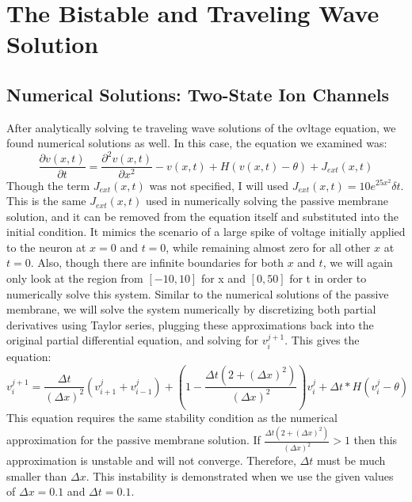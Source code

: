 \documentclass[12pt]{article}
\begin{document}
\section{The Bistable and Traveling Wave Solution}

\subsection{Numerical Solutions: Two-State Ion Channels}
After analytically solving te traveling wave solutions of the ovltage equation, we found numerical solutions as well. In this case, the equation we examined was:
\[\frac{\partial{v(x,t)}}{\partial{t}}=\frac{\partial^2{v(x,t)}}{\partial{x}^2}-v(x,t)+H(v(x,t)-\theta)+J_{ext}(x,t)\]
Though the term $J_{ext}(x,t)$ was not specified, I will used $J_{ext}(x,t)=10e^{25x^2}\delta{t}$. This is the same $J_{ext}(x,t)$ used in numerically solving the passive membrane solution, and it can be removed from the equation itself and substituted into the initial condition. It mimics the scenario of a large spike of voltage initially applied to the neuron at $x=0$ and $t=0$, while remaining almost zero for all other $x$ at $t=0$. Also, though there are infinite boundaries for both $x$ and $t$, we will again only look at the region from $[-10,10]$ for x and $[0,50]$ for t in order to numerically solve this system.  Similar to the numerical solutions of the passive membrane, we will solve the system numerically by discretizing both partial derivatives using Taylor series, plugging these approximations back into the original partial differential equation, and solving for $v^{j+1}_i$. This gives the equation:
\begin{equation} \label{**}
v^{j+1}_i=\frac{\Delta{t}}{(\Delta{x})^2}(v^{j}_{i+1}+v^{j}_{i-1})+(1-\frac{\Delta{t}(2+(\Delta{x})^2)}{(\Delta{x})^2})v^{j}_{i}+\Delta{t}*H(v^j_i-\theta)
\end {equation}
This equation requires the same stability condition as the numerical approximation for the passive membrane solution. If $\frac{\Delta{t}(2+(\Delta{x})^2)}{(\Delta{x})^2}>1$ then this approximation is unstable and will not converge. Therefore, $\Delta{t}$ must be much smaller than $\Delta{x}$. This instability is demonstrated when we use the given values of $\Delta{x}=0.1$ and $\Delta{t}=0.1$. 
\end{document}
